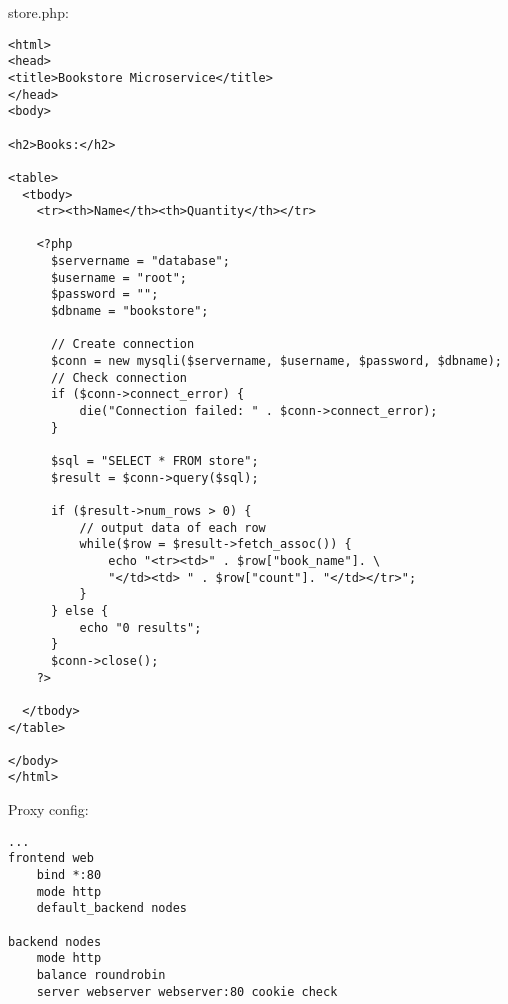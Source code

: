store.php:

\begin{verbatim}
<html>
<head>
<title>Bookstore Microservice</title>
</head>
<body>

<h2>Books:</h2>

<table>
  <tbody>
    <tr><th>Name</th><th>Quantity</th></tr>

    <?php
      $servername = "database";
      $username = "root";
      $password = "";
      $dbname = "bookstore";

      // Create connection
      $conn = new mysqli($servername, $username, $password, $dbname);
      // Check connection
      if ($conn->connect_error) {
          die("Connection failed: " . $conn->connect_error);
      }

      $sql = "SELECT * FROM store";
      $result = $conn->query($sql);

      if ($result->num_rows > 0) {
          // output data of each row
          while($row = $result->fetch_assoc()) {
              echo "<tr><td>" . $row["book_name"]. \
              "</td><td> " . $row["count"]. "</td></tr>";
          }
      } else {
          echo "0 results";
      }
      $conn->close();
    ?>

  </tbody>
</table>

</body>
</html>
\end{verbatim}

Proxy config:

\begin{verbatim}
...
frontend web
    bind *:80
    mode http
    default_backend nodes

backend nodes
    mode http
    balance roundrobin
    server webserver webserver:80 cookie check
\end{verbatim}
